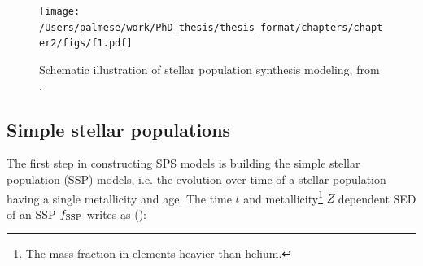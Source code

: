 \begin{figure}\centering
\texttt{[image: /Users/palmese/work/PhD\_thesis/thesis\_format/chapters/chapter2/figs/f1.pdf]}\caption{Schematic illustration of stellar population synthesis modeling, from \citet{conroy}.}\label{fig:csp}
\end{figure}

\subsection{Simple stellar populations}
The first step in constructing SPS models is building the simple stellar population (SSP) models, i.e. the evolution over time of a stellar population having a single metallicity and age. The time $t$ and metallicity\footnote{The mass fraction in elements heavier than helium.} $Z$ dependent SED of an SSP $f_{\rm SSP}$ writes as (\citealt{conroy}):

